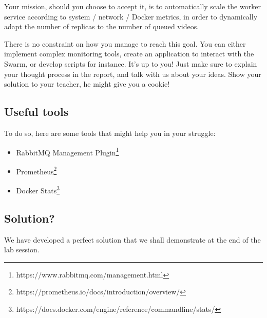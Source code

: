 \documentclass[a4paper,11pt]{exam}
\begin{document}
Your mission, should you choose to accept it, is to automatically scale the worker service according to system / network / Docker metrics, in order to dynamically adapt the number of replicas to the number of queued videos.

There is no constraint on how you manage to reach this goal.
You can either implement complex monitoring tools, create an application to interact with the Swarm, or develop scripts for instance.
It's up to you!
Just make sure to explain your thought process in the report, and talk with us about your ideas.
Show your solution to your teacher, he might give you a cookie!

\subsection{Useful tools}

To do so, here are some tools that might help you in your struggle:

\begin{itemize}

\item RabbitMQ Management Plugin\footnote{https://www.rabbitmq.com/management.html}

\item Prometheus\footnote{https://prometheus.io/docs/introduction/overview/}

\item Docker Stats\footnote{https://docs.docker.com/engine/reference/commandline/stats/}

\end{itemize}

\subsection{Solution?}

We have developed a perfect solution that we shall demonstrate at the end of the lab session.
\end{document}
